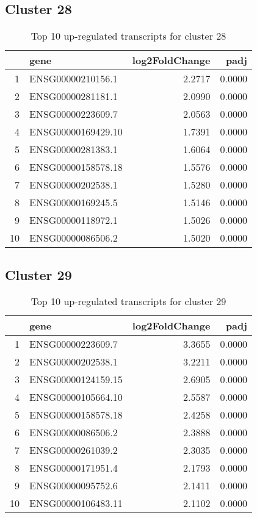 \documentclass{article}
\begin{document}
\subsection{Cluster 28 }
\begin{table}[H]
\centering
\begin{tabular}{rlrr}
  \hline
 & gene & log2FoldChange & padj \\ 
  \hline
1 & ENSG00000210156.1 & 2.2717 & 0.0000 \\ 
  2 & ENSG00000281181.1 & 2.0990 & 0.0000 \\ 
  3 & ENSG00000223609.7 & 2.0563 & 0.0000 \\ 
  4 & ENSG00000169429.10 & 1.7391 & 0.0000 \\ 
  5 & ENSG00000281383.1 & 1.6064 & 0.0000 \\ 
  6 & ENSG00000158578.18 & 1.5576 & 0.0000 \\ 
  7 & ENSG00000202538.1 & 1.5280 & 0.0000 \\ 
  8 & ENSG00000169245.5 & 1.5146 & 0.0000 \\ 
  9 & ENSG00000118972.1 & 1.5026 & 0.0000 \\ 
  10 & ENSG00000086506.2 & 1.5020 & 0.0000 \\ 
   \hline
\end{tabular}
\caption{Top 10 up-regulated transcripts for cluster 28} 
\label{tab:q3_1_28}
\end{table}
\subsection{Cluster 29 }
\begin{table}[H]
\centering
\begin{tabular}{rlrr}
  \hline
 & gene & log2FoldChange & padj \\ 
  \hline
1 & ENSG00000223609.7 & 3.3655 & 0.0000 \\ 
  2 & ENSG00000202538.1 & 3.2211 & 0.0000 \\ 
  3 & ENSG00000124159.15 & 2.6905 & 0.0000 \\ 
  4 & ENSG00000105664.10 & 2.5587 & 0.0000 \\ 
  5 & ENSG00000158578.18 & 2.4258 & 0.0000 \\ 
  6 & ENSG00000086506.2 & 2.3888 & 0.0000 \\ 
  7 & ENSG00000261039.2 & 2.3035 & 0.0000 \\ 
  8 & ENSG00000171951.4 & 2.1793 & 0.0000 \\ 
  9 & ENSG00000095752.6 & 2.1411 & 0.0000 \\ 
  10 & ENSG00000106483.11 & 2.1102 & 0.0000 \\ 
   \hline
\end{tabular}
\caption{Top 10 up-regulated transcripts for cluster 29} 
\label{tab:q3_1_29}
\end{table}
\end{document}
